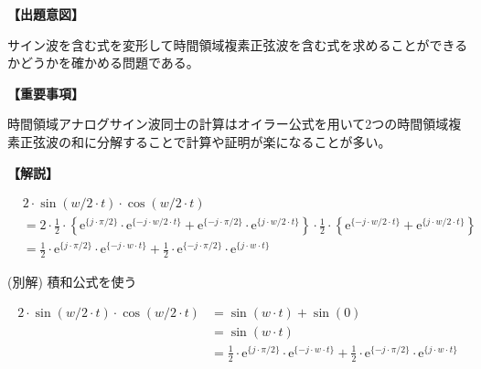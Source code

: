 \noindent \textbf{【出題意図】}

\bigskip
\noindent サイン波を含む式を変形して時間領域複素正弦波を含む式を求めることができるかどうかを確かめる問題である。

\vspace{1em}
\noindent \textbf{【重要事項】}

\medskip
\noindent 時間領域アナログサイン波同士の計算はオイラー公式を用いて2つの時間領域複素正弦波の和に分解することで計算や証明が楽になることが多い。

\bigskip

\vspace{1em}
\noindent \textbf{【解説】}

\bigskip

\begin{align*}
& 2 \cdot \sin(w/2 \cdot t) \cdot \cos( w/2 \cdot t) \\
& = 
2 \cdot
\frac{1}{2}\cdot\left \{
  \textrm{e}^{\{ j \cdot \pi/2 \}} \cdot \textrm{e}^{\{-j \cdot w/2 \cdot t \}} 
+ \textrm{e}^{\{-j \cdot \pi/2 \}} \cdot \textrm{e}^{\{ j \cdot w/2 \cdot t \}} 
\right \}
\cdot
\frac{1}{2}\cdot\left \{
  \textrm{e}^{\{-j \cdot w/2 \cdot t \}} 
+ \textrm{e}^{\{ j \cdot w/2 \cdot t \}} 
\right \} \\
& =
  \frac{1}{2} \cdot \textrm{e}^{\{ j \cdot \pi/2 \}} \cdot \textrm{e}^{\{-j \cdot w \cdot t \}}
+ \frac{1}{2} \cdot \textrm{e}^{\{-j \cdot \pi/2 \}} \cdot \textrm{e}^{\{ j \cdot w \cdot t \}}
\end{align*}

\bigskip
(別解) 積和公式を使う

\begin{align*}
2 \cdot \sin(w/2 \cdot t) \cdot \cos( w/2 \cdot t) 
&= \sin( w \cdot t ) + \sin( 0 ) \\
&= \sin( w \cdot t ) \\
& =
  \frac{1}{2} \cdot \textrm{e}^{\{ j \cdot \pi/2 \}} \cdot \textrm{e}^{\{-j \cdot w \cdot t \}}
+ \frac{1}{2} \cdot \textrm{e}^{\{-j \cdot \pi/2 \}} \cdot \textrm{e}^{\{ j \cdot w \cdot t \}}
\end{align*}

